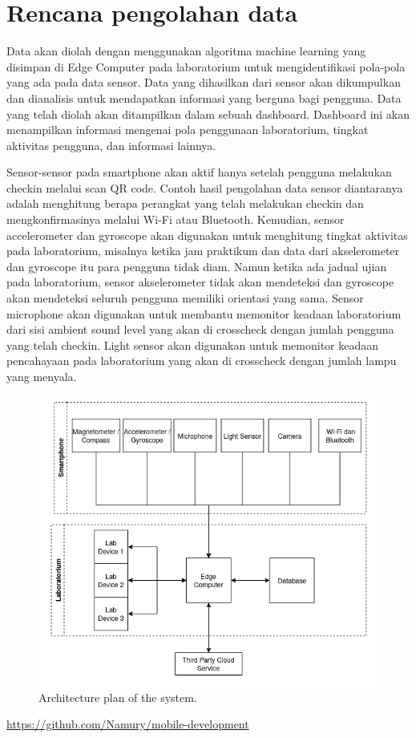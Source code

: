 \documentclass{ugm-report}
\begin{document}
\section{Rencana pengolahan data}
Data akan diolah dengan menggunakan algoritma machine learning yang disimpan di Edge Computer pada laboratorium untuk mengidentifikasi pola-pola yang ada pada data sensor. Data yang dihasilkan dari sensor akan dikumpulkan dan dianalisis untuk mendapatkan informasi yang berguna bagi pengguna. 
Data yang telah diolah akan ditampilkan dalam sebuah dashboard. Dashboard ini akan menampilkan informasi mengenai pola penggunaan laboratorium, tingkat aktivitas pengguna, dan informasi lainnya. \par
Sensor-sensor pada smartphone akan aktif hanya setelah pengguna melakukan checkin melalui scan QR code. Contoh hasil pengolahan data sensor diantaranya adalah menghitung berapa perangkat yang telah melakukan checkin dan mengkonfirmasinya melalui Wi-Fi atau Bluetooth. Kemudian, sensor accelerometer dan gyroscope akan digunakan untuk menghitung tingkat aktivitas pada laboratorium, misalnya ketika jam praktikum dan data dari akselerometer dan gyroscope itu para pengguna tidak diam. Namun ketika ada jadual ujian pada laboratorium, sensor akselerometer tidak akan mendeteksi dan gyroscope akan mendeteksi seluruh pengguna memiliki orientasi yang sama. Sensor microphone akan digunakan untuk membantu memonitor keadaan laboratorium dari sisi ambient sound level yang akan di crosscheck dengan jumlah pengguna yang telah checkin. Light sensor akan digunakan untuk memonitor keadaan pencahayaan pada laboratorium yang akan di crosscheck dengan jumlah lampu yang menyala.

\begin{figure}[htbp]
	\centerline{\includegraphics{image/fig1.png}}
	\caption{Architecture plan of the system.}
	\label{fig1}
\end{figure}

\url{https://github.com/Namury/mobile-development}
\end{document}
